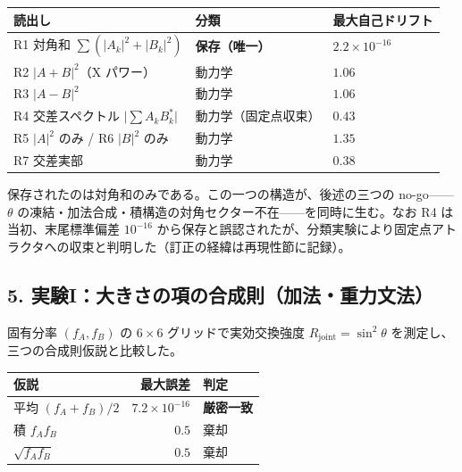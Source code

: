 \documentclass[
  a4paper,
]{ltjsarticle}
\newcounter{none} %
\begin{document}
{\def\LTcaptype{none} %
\begin{longtable}[]{@{}
  >{\raggedright\arraybackslash}p{}
  >{\raggedright\arraybackslash}p{}
  >{\raggedleft\arraybackslash}p{}@{}}
\toprule\noalign{}
\begin{minipage}[b]{\linewidth}\raggedright
読出し
\end{minipage} & \begin{minipage}[b]{\linewidth}\raggedright
分類
\end{minipage} & \begin{minipage}[b]{\linewidth}\raggedleft
最大自己ドリフト
\end{minipage} \\
\midrule\noalign{}
\endhead
\bottomrule\noalign{}
\endlastfoot
R1 対角和 \(\sum(\lvert A_k\rvert^2+\lvert B_k\rvert^2)\) &
\textbf{保存（唯一）} & \(2.2\times10^{-16}\) \\
R2 \(\lvert A+B\rvert^2\)（X パワー） & 動力学 & \(1.06\) \\
R3 \(\lvert A-B\rvert^2\) & 動力学 & \(1.06\) \\
R4 交差スペクトル \(\lvert\sum A_k B_k^*\rvert\) & 動力学（固定点収束）
& \(0.43\) \\
R5 \(\lvert A\rvert^2\) のみ / R6 \(\lvert B\rvert^2\) のみ & 動力学 &
\(1.35\) \\
R7 交差実部 & 動力学 & \(0.38\) \\
\end{longtable}
}

保存されたのは対角和のみである。この一つの構造が、後述の三つの
no-go------\(\theta\)
の凍結・加法合成・積構造の対角セクター不在------を同時に生む。なお R4
は当初、末尾標準偏差 \(10^{-16}\)
から保存と誤認されたが、分類実験により固定点アトラクタへの収束と判明した（訂正の経緯は再現性節に記録）。

\subsection{5.
実験I：大きさの項の合成則（加法・重力文法）}\label{ux5b9fux9a13iux5927ux304dux3055ux306eux9805ux306eux5408ux6210ux5247ux52a0ux6cd5ux91cdux529bux6587ux6cd5}

固有分率 \((f_A,f_B)\) の \(6\times6\) グリッドで実効交換強度
\(R_{\mathrm{joint}}=\sin^2\theta\)
を測定し、三つの合成則仮説と比較した。

{\def\LTcaptype{none} %
\begin{longtable}[]{@{}lrl@{}}
\toprule\noalign{}
仮説 & 最大誤差 & 判定 \\
\midrule\noalign{}
\endhead
\bottomrule\noalign{}
\endlastfoot
平均 \((f_A+f_B)/2\) & \(7.2\times10^{-16}\) & \textbf{厳密一致} \\
積 \(f_Af_B\) & \(0.5\) & 棄却 \\
\(\sqrt{f_Af_B}\) & \(0.5\) & 棄却 \\
\end{longtable}
}
\end{document}
